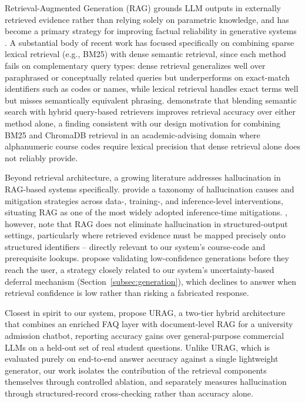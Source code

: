 \documentclass[a4paper,twoside]{article}
\begin{document}
Retrieval-Augmented Generation (RAG) grounds LLM outputs in externally retrieved evidence rather than relying solely on parametric knowledge, and has become a primary strategy for improving factual reliability in generative systems \citep{lewis2020}. A substantial body of recent work has focused specifically on combining sparse lexical retrieval (e.g., BM25) with dense semantic retrieval, since each method fails on complementary query types: dense retrieval generalizes well over paraphrased or conceptually related queries but underperforms on exact-match identifiers such as codes or names, while lexical retrieval handles exact terms well but misses semantically equivalent phrasing. \citet{sawarkar2024} demonstrate that blending semantic search with hybrid query-based retrievers improves retrieval accuracy over either method alone, a finding consistent with our design motivation for combining BM25 and ChromaDB retrieval in an academic-advising domain where alphanumeric course codes require lexical precision that dense retrieval alone does not reliably provide.

Beyond retrieval architecture, a growing literature addresses hallucination in RAG-based systems specifically. \citet{huang2023} provide a taxonomy of hallucination causes and mitigation strategies across data-, training-, and inference-level interventions, situating RAG as one of the most widely adopted inference-time mitigations. \citet{bechard2024}, however, note that RAG does not eliminate hallucination in structured-output settings, particularly where retrieved evidence must be mapped precisely onto structured identifiers -- directly relevant to our system's course-code and prerequisite lookups. \citet{varshney2023} propose validating low-confidence generations before they reach the user, a strategy closely related to our system's uncertainty-based deferral mechanism (Section~\ref{subsec:generation}), which declines to answer when retrieval confidence is low rather than risking a fabricated response.

Closest in spirit to our system, \citet{urag2025} propose URAG, a two-tier hybrid architecture that combines an enriched FAQ layer with document-level RAG for a university admission chatbot, reporting accuracy gains over general-purpose commercial LLMs on a held-out set of real student questions. Unlike URAG, which is evaluated purely on end-to-end answer accuracy against a single lightweight generator, our work isolates the contribution of the retrieval components themselves through controlled ablation, and separately measures hallucination through structured-record cross-checking rather than accuracy alone.
\end{document}
